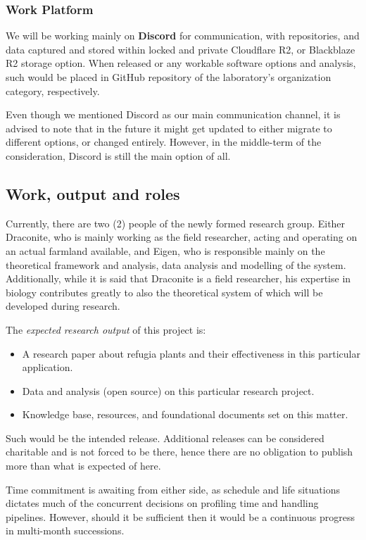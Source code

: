 \documentclass[twocolumn,letterpaper, 12pt]{article}
\begin{document}
\subsubsection{Work Platform}
We will be working mainly on \textbf{Discord} for communication, with repositories, and data captured and stored within locked and private Cloudflare R2, or Blackblaze R2 storage option. When released or any workable software options and analysis, such would be placed in GitHub repository of the laboratory's organization category, respectively. 

Even though we mentioned Discord as our main communication channel, it is advised to note that in the future it might get updated to either migrate to different options, or changed entirely. However, in the middle-term of the consideration, Discord is still the main option of all. 

\subsection{Work, output and roles}
Currently, there are two (2) people of the newly formed research group. Either Draconite, who is mainly working as the field researcher, acting and operating on an actual farmland available, and Eigen, who is responsible mainly on the theoretical framework and analysis, data analysis and modelling of the system. Additionally, while it is said that Draconite is a field researcher, his expertise in biology contributes greatly to also the theoretical system of which will be developed during research. 

The \textit{expected research output} of this project is: 
\begin{itemize}
    \item A research paper about refugia plants and their effectiveness in this particular application. 
    \item Data and analysis (open source) on this particular research project. 
    \item Knowledge base, resources, and foundational documents set on this matter. 
\end{itemize}
Such would be the intended release. Additional releases can be considered charitable and is not forced to be there, hence there are no obligation to publish more than what is expected of here. 

Time commitment is awaiting from either side, as schedule and life situations dictates much of the concurrent decisions on profiling time and handling pipelines. However, should it be sufficient then it would be a continuous progress in multi-month successions. 
\end{document}

